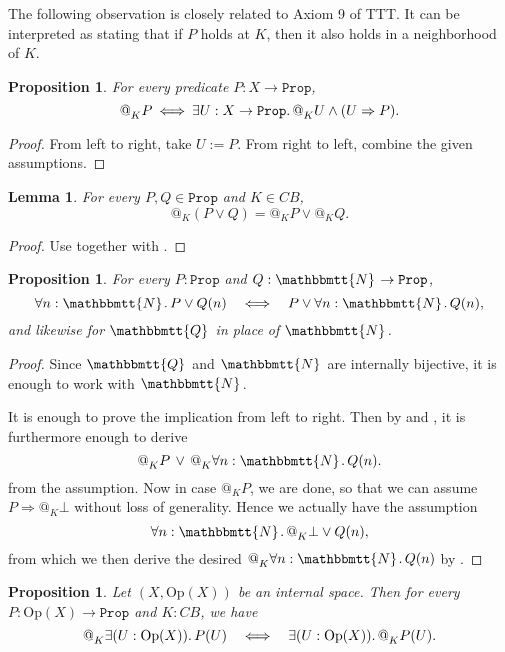 \documentclass[11pt, oneside, article]{memoir}
\makeatletter
\theoremstyle{plain}
\newtheorem{proposition}[theorem]{Proposition}
\newtheorem{lemma}[theorem]{Lemma}
\theoremstyle{definition}
\theoremstyle{remark}
\newcommand{\const}[1]{\mathtt{#1}}
\newcommand{\Set}[1]{\mathrm{#1}}
\newcommand{\internal}[1]{\raisebox{-.03ex}{$\mathbbmtt{#1}$}}
\newcommand{\hs}{\hspace{1.1pt}}
\newcommand{\tNN}{\internal{N}\hs}
\newcommand{\tQQ}{\internal{Q}\hs}
\newcommand{\Prop}{\const{Prop}}
\newcommand{\Op}{\Set{Op}}
\newcommand{\BaseSpace}{B}
\newcommand{\CB}{C\BaseSpace}
\newcommand{\AtSymbol}{{@}}
\newcommand{\At}[2][]{\AtSymbol^{#1}_{#2}}
\newcommand{\imp}{\Rightarrow}
\makeatother
\begin{document}
The following observation is closely related to Axiom 9 of TTT. It can be interpreted as stating that if $P$ holds at $K$, then it also holds in a neighborhood of $K$.

\begin{proposition}
	\label{prop.at_to_nghbhd}
	For every predicate $P : X \to \Prop$,
	\[
		\At{K} P \: \Longleftrightarrow \: \exists U : X \to \Prop \ldotp \At{K} U \wedge (U \imp P).
	\]
\end{proposition}

\begin{proof}
	From left to right, take $U := P$. From right to left, combine the given assumptions.	
\end{proof}

\begin{lemma}
	\label{lem.at_vs_or}
	For every $P,Q \in \Prop$ and $K \in \CB$,
	\[
		\At{K}(P \lor Q) = \At{K}P \lor \At{K}Q.
	\]
\end{lemma}

\begin{proof}
	Use  together with .
\end{proof}

\begin{proposition}
	\label{prop.N_or_vs_forall}
	For every $P : \Prop$ and $Q : \tNN \to \Prop$,
	\[
		\forall n : \tNN\ldotp P \lor Q(n) \quad \Longleftrightarrow \quad P \lor \forall n : \tNN \ldotp Q(n),
	\]
	and likewise for $\tQQ$ in place of $\tNN$.
\end{proposition}

\begin{proof}
	Since $\tQQ$ and $\tNN$ are internally bijective, it is enough to work with $\tNN$.

	It is enough to prove the implication from left to right. Then by  and , it is furthermore enough to derive
	\[
		\At{K} P \, \lor \, \At{K} \forall n : \tNN \ldotp Q(n).
	\]
	from the assumption. Now in case $\At{K} P$, we are done, so that we can assume $P \imp \At{K} \bot$ without loss of generality. Hence we actually have the assumption
	\[
		\forall n : \tNN \ldotp \At{K} \bot \lor Q(n),
	\]
	from which we then derive the desired $\At{K} \forall n : \tNN \ldotp Q(n)$ by .
\end{proof}

\begin{proposition}
	Let $(X,\Op(X))$ be an internal space. Then for every $P : \Op(X)\to \Prop$ and $K : \CB$, we have
	\[
		\At{K} \exists (U : \Op(X))\ldotp P(U) \quad \Longleftrightarrow \quad \exists (U : \Op(X))\ldotp \At{K} P(U).
	\]
\end{proposition}
\end{document}
